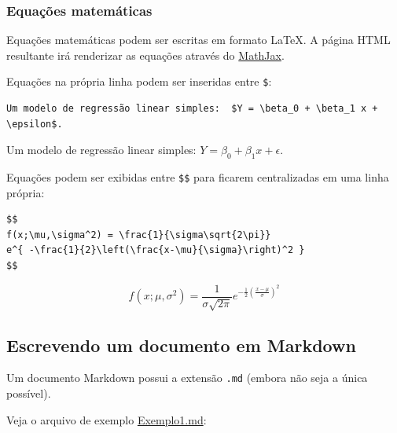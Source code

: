 \documentclass[10pt,a4paper]{book}
\begin{document}
\subsubsection*{Equações matemáticas}\label{equacoes-matematicas}


Equações matemáticas podem ser escritas em formato LaTeX. A página HTML
resultante irá renderizar as equações através do
\href{http://www.mathjax.org}{MathJax}.

Equações na própria linha podem ser inseridas entre \texttt{\$}:

\begin{verbatim}
Um modelo de regressão linear simples:  $Y = \beta_0 + \beta_1 x + \epsilon$.
\end{verbatim}

Um modelo de regressão linear simples:
\(Y = \beta_0 + \beta_1 x + \epsilon\).

Equações podem ser exibidas entre \texttt{\$\$} para ficarem
centralizadas em uma linha própria:

\begin{verbatim}
$$
f(x;\mu,\sigma^2) = \frac{1}{\sigma\sqrt{2\pi}}
e^{ -\frac{1}{2}\left(\frac{x-\mu}{\sigma}\right)^2 }
$$
\end{verbatim}

\[
f(x;\mu,\sigma^2) = \frac{1}{\sigma\sqrt{2\pi}}
e^{ -\frac{1}{2}\left(\frac{x-\mu}{\sigma}\right)^2 }
\]

\subsection{Escrevendo um documento em
Markdown}\label{escrevendo-um-documento-em-markdown}

Um documento Markdown possui a extensão \texttt{.md} (embora não seja a
única possível).

Veja o arquivo de exemplo \href{exemplos/Exemplo1.md}{Exemplo1.md}:
\end{document}
